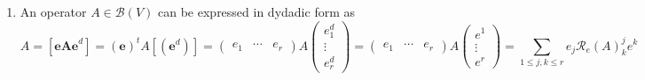 \documentclass[aps,preprint]{revtex4}
\begin{document}
\begin{enumerate}
\begin{enumerate}
\item 
\begin{equation}
\mathbb{I}_{r}=\left( 
\begin{array}{c}
e_{1}^{d} \\ 
\vdots \\ 
e_{r}^{d}%
\end{array}%
\right) \left( 
\begin{array}{ccc}
e_{1} & \cdots & e_{r}%
\end{array}%
\right) =\left( 
\begin{array}{c}
e^{1} \\ 
\vdots \\ 
e^{r}%
\end{array}%
\right) \left( 
\begin{array}{ccc}
e_{1} & \cdots & e_{r}%
\end{array}%
\right) =\left( 
\begin{array}{c}
f_{1}^{d} \\ 
\vdots \\ 
f_{r}^{d}%
\end{array}%
\right) \left( 
\begin{array}{ccc}
f_{1} & \cdots & f_{r}%
\end{array}%
\right) =\left( 
\begin{array}{c}
f^{1} \\ 
\vdots \\ 
f^{r}%
\end{array}%
\right) \left( 
\begin{array}{ccc}
f_{1} & \cdots & f_{r}%
\end{array}%
\right)
\end{equation}
\end{enumerate}

\item An operator $A\in \mathcal{B}\left( V\right) $ can be expressed in
dydadic form as 
\begin{equation}
A=\left[ \boldsymbol{eAe}^{d}\right] =\left( \boldsymbol{e}\right) ^{t}A%
\left[ \left( \boldsymbol{e}^{d}\right) \right] =\left( 
\begin{array}{ccc}
e_{1} & \cdots & e_{r}%
\end{array}%
\right) A\left( 
\begin{array}{c}
e_{1}^{d} \\ 
\vdots \\ 
e_{r}^{d}%
\end{array}%
\right) =\left( 
\begin{array}{ccc}
e_{1} & \cdots & e_{r}%
\end{array}%
\right) A\left( 
\begin{array}{c}
e^{1} \\ 
\vdots \\ 
e^{r}%
\end{array}%
\right) =\sum_{1\leq j,k\leq r}e_{j}\mathcal{R}_{e}\left( A\right)
_{k}^{j}e^{k}
\end{equation}


\end{enumerate}
\end{document}
